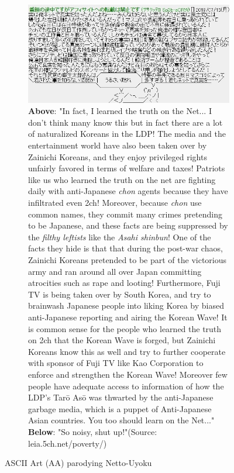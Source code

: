 \documentclass[10pt,british,A4paper,twoside]{memoir}
\begin{document}
\begin{figure}[!htb]
 \centering
 \begin{subfigure}[b]{0.95\textwidth}
 \includegraphics[width=\textwidth]{images/2channel/anti-aa.jpg}
 \caption*{\textbf{Above}: "In fact, I learned the truth on the Net... I don’t think many know this but in fact there are a lot of naturalized Koreans in the LDP! The media and the entertainment world have also been taken over by Zainichi Koreans, and they enjoy privileged rights unfairly favored in terms of welfare and taxes! Patriots like us who learned the truth on the net are fighting daily with anti-Japanese \textit{chon} agents because they have infiltrated even 2ch! Moreover, because \textit{chon} use common names, they commit many crimes pretending to be Japanese, and these facts are being suppressed by the \textit{filthy leftists} like the \textit{Asahi shinbun}! One of the facts they hide is that that during the post-war chaos, Zainichi Koreans pretended to be part of the victorious army and ran around all over Japan committing atrocities such as rape and looting! Furthermore, Fuji TV is being taken over by South Korea, and try to brainwash Japanese people into liking Korea by biased anti-Japanese reporting and airing the Korean Wave! It is common sense for the people who learned the truth on 2ch that the Korean Wave is forged, but Zainichi Koreans know this as well and try to further cooperate with sponsor of Fuji TV like Kao Corporation to enforce and strengthen the Korean Wave! Moreover few people have adequate access to information of how the LDP’s Tarō Asō was thwarted by the anti-Japanese garbage media, which is a puppet of Anti-Japanese Asian countries. You too should learn on the Net..." \textbf{Below}: "So noisy, shut up!"\newline (Source: leia.5ch.net/poverty/)}
 \label{fig:aajp}
 \end{subfigure}
 \caption{ASCII Art (AA) parodying Netto-Uyoku}\label{fig:aa}
\end{figure}
\end{document}
